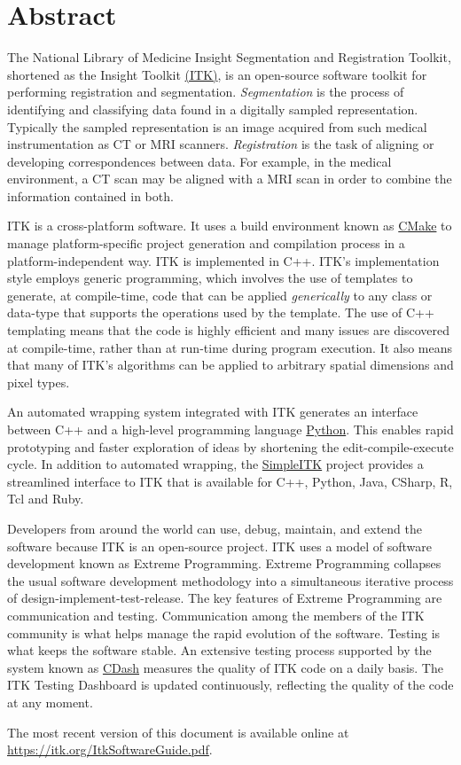 \chapter*{Abstract}
\noindent
The National Library of Medicine Insight Segmentation and Registration Toolkit,
shortened as the Insight Toolkit \href{https://itk.org}{(ITK)}, is an
open-source software toolkit for performing registration and
segmentation. \emph{Segmentation} is the process of identifying and
classifying data found in a digitally sampled
representation. Typically the sampled representation is an image
acquired from such medical instrumentation as CT or MRI
scanners. \emph{Registration} is the task of aligning or developing
correspondences between data. For example, in the medical environment,
a CT scan may be aligned with a MRI scan in order to combine the
information contained in both.

ITK is a cross-platform software. It uses a build environment known as
\href{https://cmake.org}{CMake} to manage platform-specific project
generation and compilation process in a platform-independent way. ITK is
implemented in C++. ITK's implementation style employs generic programming,
which involves the use of templates to generate, at compile-time, code that can
be applied \emph{generically} to any class or data-type that supports the
operations used by the template. The use of C++ templating means that the code
is highly efficient and many issues are discovered at compile-time, rather than
at run-time during program execution. It also means that many of ITK's
algorithms can be applied to arbitrary spatial dimensions and pixel types.

An automated wrapping system integrated with ITK generates an interface between
C++ and a high-level programming language \href{http://www.python.org}{Python}.
This enables rapid prototyping and faster exploration of ideas by shortening the
edit-compile-execute cycle. In addition to automated
wrapping, the \href{https://www.itk.org/Wiki/SimpleITK}{SimpleITK} project
provides a streamlined interface to ITK that is available for C++, Python, Java,
CSharp, R, Tcl and Ruby.

Developers from around the world can use, debug, maintain, and extend the
software because ITK is an open-source project. ITK uses a
model of software development known as Extreme
Programming. Extreme Programming collapses the usual software development
methodology into a simultaneous iterative process of
design-implement-test-release. The key features of Extreme Programming
are communication and testing. Communication among the members of the
ITK community is what helps manage the rapid evolution of the
software. Testing is what keeps the software stable. An
extensive testing process supported by the system known as
\href{http://open.cdash.org/index.php?project=Insight}{CDash}
measures the quality of ITK code on a daily basis. The ITK Testing Dashboard is
updated continuously, reflecting the quality of the code at any moment.

The most recent version of this document is available online at
\url{https://itk.org/ItkSoftwareGuide.pdf}.
